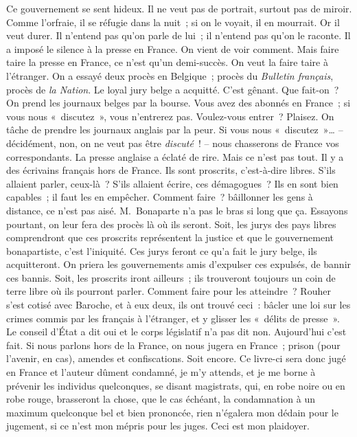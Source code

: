 \documentclass[french,twoside]{book} %
\begin{document}
Ce gouvernement se sent hideux. Il ne veut pas de portrait, surtout pas de miroir. Comme l’orfraie, il se réfugie dans la nuit ; si on le voyait, il en mourrait. Or il veut durer. Il n’entend pas qu’on parle de lui ; il n’entend pas qu’on le raconte. Il a imposé le silence à la presse en France. On vient de voir comment. Mais faire taire la presse en France, ce n’est qu’un demi-succès. On veut la faire taire à l’étranger. On a essayé deux procès en Belgique ; procès du \emph{Bulletin français}, procès de \emph{la Nation}. Le loyal jury belge a acquitté. C’est gênant. Que fait-on ? On prend les journaux belges par la bourse. Vous avez des abonnés en France ; si vous nous « discutez », vous n’entrerez pas. Voulez-vous entrer ? Plaisez. On tâche de prendre les journaux anglais par la peur. Si vous nous « discutez »… – décidément, non, on ne veut pas être \emph{discuté} ! – nous chasserons de France vos correspondants. La presse anglaise a éclaté de rire. Mais ce n’est pas tout. Il y a des écrivains français hors de France. Ils sont proscrits, c’est-à-dire libres. S’ils allaient parler, ceux-là ? S’ils allaient écrire, ces démagogues ? Ils en sont bien capables ; il faut les en empêcher. Comment faire ? bâillonner les gens à distance, ce n’est pas aisé. M. Bonaparte n’a pas le bras si long que ça. Essayons pourtant, on leur fera des procès là où ils seront. Soit, les jurys des pays libres comprendront que ces proscrits représentent la justice et que le gouvernement bonapartiste, c’est l’iniquité. Ces jurys feront ce qu’a fait le jury belge, ils acquitteront. On priera les gouvernements amis d’expulser ces expulsés, de bannir ces bannis. Soit, les proscrits iront ailleurs ; ils trouveront toujours un coin de terre libre où ils pourront parler. Comment faire pour les atteindre ? Rouher s’est cotisé avec Baroche, et à eux deux, ils ont trouvé ceci : bâcler une loi sur les crimes commis par les français à l’étranger, et y glisser les « délits de presse ». Le conseil d’État a dit oui et le corps législatif n’a pas dit non. Aujourd’hui c’est fait. Si nous parlons hors de la France, on nous jugera en France ; prison (pour l’avenir, en cas), amendes et confiscations. Soit encore. Ce livre-ci sera donc jugé en France et l’auteur dûment condamné, je m’y attends, et je me borne à prévenir les individus quelconques, se disant magistrats, qui, en robe noire ou en robe rouge, brasseront la chose, que le cas échéant, la condamnation à un maximum quelconque bel et bien prononcée, rien n’égalera mon dédain pour le jugement, si ce n’est mon mépris pour les juges. Ceci est mon plaidoyer.
\end{document}
